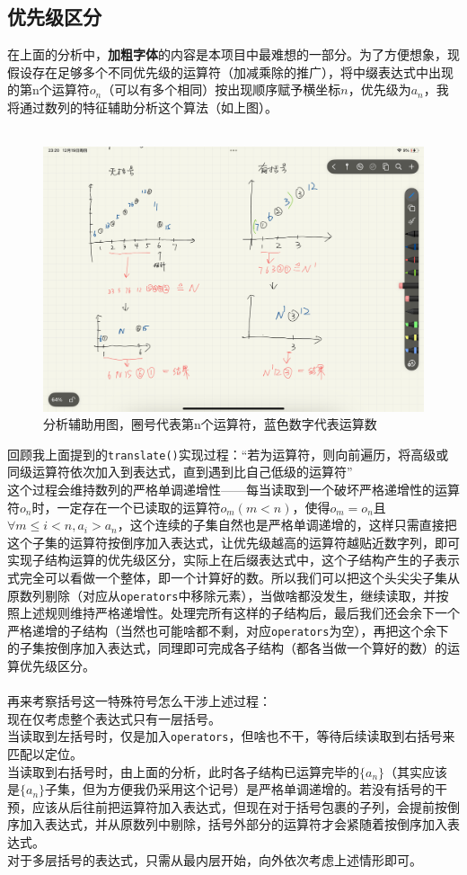 \documentclass[UTF8]{ctexart}
\begin{document}
\subsection{优先级区分}
在上面的分析中，\textbf{加粗字体}的内容是本项目中最难想的一部分。为了方便想象，现假设存在足够多个不同优先级的运算符（加减乘除的推广），将中缀表达式中出现的第n个运算符$o_n$（可以有多个相同）按出现顺序赋予横坐标$n$，优先级为$a_n$，我将通过数列的特征辅助分析这个算法（如上图）。\\\\
\begin{figure}
    \centering
    \includegraphics[width=0.5\linewidth]{analysis_figure.PNG}
    \caption{分析辅助用图，圈号代表第n个运算符，蓝色数字代表运算数}
    \label{fig:enter-label}
\end{figure}
回顾我上面提到的\verb|translate()|实现过程：“若为运算符，则向前遍历，将高级或同级运算符依次加入到表达式，直到遇到比自己低级的运算符”\\
这个过程会维持数列的严格单调递增性——每当读取到一个破坏严格递增性的运算符$o_n$时，一定存在一个已读取的运算符$o_m(m<n)$，使得$o_m=o_n$且$\forall m\leq i<n,a_i>a_n$，这个连续的子集自然也是严格单调递增的，这样只需直接把这个子集的运算符按倒序加入表达式，让优先级越高的运算符越贴近数字列，即可实现子结构运算的优先级区分，实际上在后缀表达式中，这个子结构产生的子表示式完全可以看做一个整体，即一个计算好的数。所以我们可以把这个头尖尖子集从原数列剔除（对应从\verb|operators|中移除元素），当做啥都没发生，继续读取，并按照上述规则维持严格递增性。处理完所有这样的子结构后，最后我们还会余下一个严格递增的子结构（当然也可能啥都不剩，对应\verb|operators|为空），再把这个余下的子集按倒序加入表达式，同理即可完成各子结构（都各当做一个算好的数）的运算优先级区分。\\\\

再来考察括号这一特殊符号怎么干涉上述过程：\\
现在仅考虑整个表达式只有一层括号。\\
当读取到左括号时，仅是加入\verb|operators|，但啥也不干，等待后续读取到右括号来匹配以定位。\\
当读取到右括号时，由上面的分析，此时各子结构已运算完毕的$\{a_n\}$（其实应该是$\{a_n\}$子集，但为方便我仍采用这个记号）是严格单调递增的。若没有括号的干预，应该从后往前把运算符加入表达式，但现在对于括号包裹的子列，会提前按倒序加入表达式，并从原数列中剔除，括号外部分的运算符才会紧随着按倒序加入表达式。\\
对于多层括号的表达式，只需从最内层开始，向外依次考虑上述情形即可。\\
\end{document}

